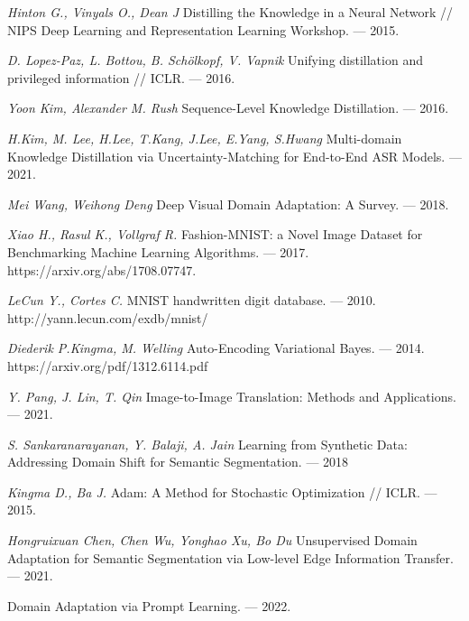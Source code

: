 \newpage


\begin{thebibliography}{99}
	\textit{Hinton G., Vinyals O., Dean J} Distilling the Knowledge in a Neural Network // NIPS Deep Learning and Representation Learning Workshop. — 2015.
    
    \textit{D. Lopez-Paz, L. Bottou, B. Schölkopf, V. Vapnik} Unifying distillation and privileged information // ICLR. — 2016.
	
	\textit{Yoon Kim, Alexander M. Rush} Sequence-Level Knowledge Distillation. — 2016.
	
	\textit{H.Kim, M. Lee, H.Lee, T.Kang, J.Lee, E.Yang, S.Hwang} Multi-domain Knowledge Distillation via Uncertainty-Matching for End-to-End ASR Models. — 2021.
	
	\textit{Mei Wang, Weihong Deng} Deep Visual Domain Adaptation: A Survey. — 2018.
	
    \textit{Xiao H., Rasul K., Vollgraf R.} Fashion-MNIST: a Novel Image Dataset for
    Benchmarking Machine Learning Algorithms. — 2017. https://arxiv.org/abs/1708.07747.
    
    \textit{LeCun Y., Cortes C.} MNIST handwritten digit database. --- 2010. http://yann.lecun.com/exdb/mnist/
    
    \textit{Diederik P.Kingma, M. Welling} Auto-Encoding Variational Bayes. --- 2014. https://arxiv.org/pdf/1312.6114.pdf
    
    \textit{Y. Pang, J. Lin, T. Qin} Image-to-Image Translation: Methods and 
    Applications. --- 2021.
    
    \textit{S. Sankaranarayanan, Y. Balaji, A. Jain} Learning from Synthetic Data: Addressing Domain Shift for Semantic Segmentation. --- 2018
    
    \textit{Kingma D., Ba J.} Adam: A Method for Stochastic Optimization // ICLR. — 2015.
    
    \textit{Hongruixuan Chen, Chen Wu, Yonghao Xu, Bo Du} Unsupervised Domain Adaptation for Semantic Segmentation via Low-level Edge Information Transfer. --- 2021.
    
     Domain Adaptation via Prompt Learning. --- 2022.

	
\end{thebibliography}

